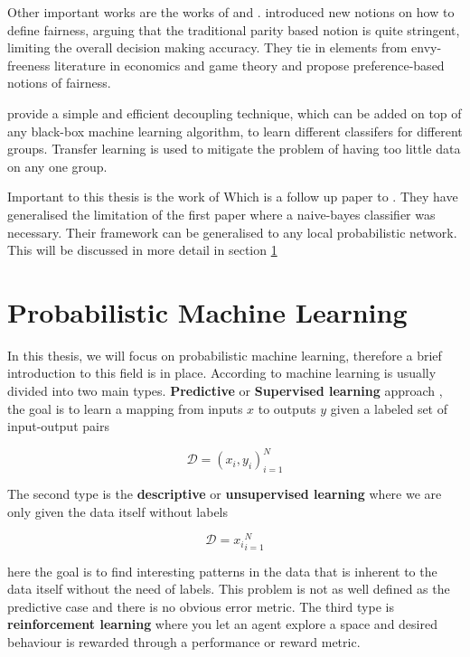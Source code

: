 Other important works are the works of \cite{Zafar:2017:NIPS} and \citet{Dwork:2018:PMLR}. \citet{Zafar:2017:NIPS} introduced new notions on how to define fairness, arguing that the traditional parity based notion is  quite stringent, limiting the overall decision making accuracy. They tie in elements from envy-freeness literature in economics and game theory and propose preference-based notions of fairness. 

\citet{Dwork:2018:PMLR} provide a simple and efficient decoupling technique, which can be added on top of any black-box machine learning algorithm, to learn different classifers for different groups. Transfer learning is used to mitigate the problem of having too little data on any one group.

Important to this thesis is the work of \citet{Choi:2021:AIII} Which is a follow up paper to \cite{Calders:20210:DMKD}. They have generalised the limitation of the first paper where a naive-bayes classifier was necessary. Their framework can be generalised to any local probabilistic network. This will be discussed in more detail in section \ref{sec:probmac}

\section{Probabilistic Machine Learning}
\label{sec:probmac}

In this thesis, we will focus on probabilistic machine learning, therefore a brief introduction to this field is in place. According to \citet{Murphy:2012:Book} machine learning is usually divided into two main types. \textbf{Predictive} or \textbf{Supervised learning} approach \cite[p.~2]{Murphy:2012:Book}, the goal is to learn a mapping from inputs $x$ to outputs $y$ given a labeled set of input-output pairs

\begin{equation}
    \mathcal{D} = {(x_i, y_i)}_{i=1}^N
\end{equation}

The second type is the \textbf{descriptive} or \textbf{unsupervised learning} where we are only given the data itself without labels

\begin{equation}
    \mathcal{D} = {x_i}_{i=1}^N
\end{equation}

here the goal is to find interesting patterns in the data that is inherent to the data itself without the need of labels. This problem is not as well defined as the predictive case and there is no obvious error metric. The third type is \textbf{reinforcement learning} where you let an agent explore a space and desired behaviour is rewarded through a performance or reward metric. 

